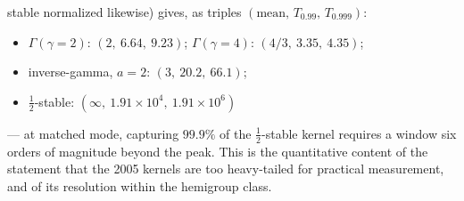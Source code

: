 \begin{example}
stable normalized likewise) gives, as triples $(\text{mean},\, T_{0.99},\, T_{0.999})$:
\begin{itemize}
\item $\Gamma(\gamma{=}2)$: $(2,\ 6.64,\ 9.23)$; $\Gamma(\gamma{=}4)$: $(4/3,\ 3.35,\ 4.35)$;
\item inverse-gamma, $a = 2$: $(3,\ 20.2,\ 66.1)$;
\item $\tfrac12$-stable: $(\infty,\ 1.91 \times 10^{4},\ 1.91 \times 10^{6})$
\end{itemize}
--- at matched mode, capturing $99.9\%$ of the $\tfrac12$-stable kernel requires a window
six orders of magnitude beyond the peak. This is the quantitative content of the statement
that the 2005 kernels are too heavy-tailed for practical measurement, and of its resolution
within the hemigroup class.
\end{example}
